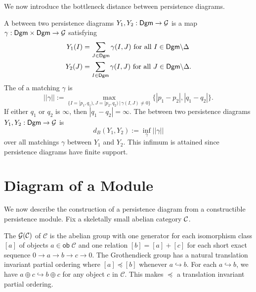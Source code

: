 \documentclass[12pt]{article}
\begin{document}
We now introduce the bottleneck distance between persistence diagrams.

\begin{defn}
A  between two persistence diagrams $Y_1, Y_2 : {\mathsf{Dgm}} \to {\mathcal{G}}$ is a 
map $\gamma: {\mathsf{Dgm}} \times {\mathsf{Dgm}} \to {\mathcal{G}}$ 
satisfying 
	\begin{align*}
	Y_1(I) & = \sum_{J \in {\mathsf{Dgm}}} \gamma(I,J) \textrm{ for all }I \in {\mathsf{Dgm}} \backslash \Delta \\
	Y_2(J) & = \sum_{I \in {\mathsf{Dgm}}} \gamma(I,J) \textrm{ for all } J \in {\mathsf{Dgm}} \backslash \Delta.
	\end{align*}
The  of a matching $\gamma$ is
$$ ||\gamma|| := \max_{\big \{I=[p_1,q_1),J=[p_2,q_2) \,\big |\, \gamma(I,J)\neq 0 \big \}} 
\big \{|p_1-p_2|,|q_1-q_2| \big\}. $$
If either $q_1$ or $q_2$ is $\infty$, then $ | q_1 - q_2 | = \infty$.
The  between two persistence diagrams $Y_1, Y_2 : {\mathsf{Dgm}} \to {\mathcal{G}}$ is 
$$d_B(Y_1,Y_2) := \inf_\gamma ||\gamma||$$ 
over all matchings $\gamma$ between $Y_1$ and $Y_2$.
This infimum is attained since persistence diagrams have finite support.
\end{defn}

\section{Diagram of a Module}
We now describe the construction of a persistence diagram
from a constructible persistence module.
Fix a skeletally small abelian category ${\mathcal{C}}$.

\begin{defn}
The  ${\mathcal{G}}(\mathcal{C})$ of $\mathcal{C}$ is the abelian group 
with one generator for each 
isomorphism class $[a]$ of objects $a \in \mathsf{ob}\; \mathcal{C}$ and one relation
$[b] = [a] + [c]$
for each short exact sequence
$0 \to a \to b \to c \to 0.$
The Grothendieck group has a natural translation invariant partial ordering where
$[a] \preceq [b]$ whenever $a\hookrightarrow b$.
For each $a\hookrightarrow b$, we have 
$a \oplus c \hookrightarrow b \oplus c$ for any object $c$ in $\mathcal{C}$.
This makes $\preceq$ a translation invariant partial ordering.
\end{defn}
\end{document}
